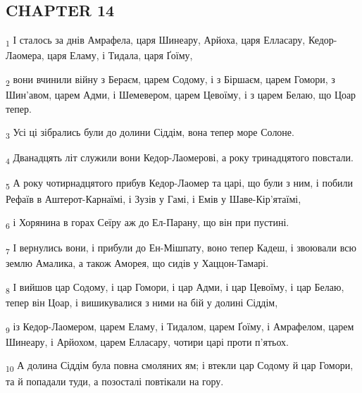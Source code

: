 \subsection{CHAPTER 14}
\begin{tcolorbox}
\textsubscript{1} І сталось за днів Амрафела, царя Шинеару, Арйоха, царя Елласару, Кедор-Лаомера, царя Еламу, і Тидала, царя Ґоїму,
\end{tcolorbox}
\begin{tcolorbox}
\textsubscript{2} вони вчинили війну з Бераєм, царем Содому, і з Біршаєм, царем Гомори, з Шин'авом, царем Адми, і Шемевером, царем Цевоїму, і з царем Белаю, що Цоар тепер.
\end{tcolorbox}
\begin{tcolorbox}
\textsubscript{3} Усі ці зібрались були до долини Сіддім, вона тепер море Солоне.
\end{tcolorbox}
\begin{tcolorbox}
\textsubscript{4} Дванадцять літ служили вони Кедор-Лаомерові, а року тринадцятого повстали.
\end{tcolorbox}
\begin{tcolorbox}
\textsubscript{5} А року чотирнадцятого прибув Кедор-Лаомер та царі, що були з ним, і побили Рефаїв в Аштерот-Карнаїмі, і Зузів у Гамі, і Емів у Шаве-Кір'ятаїмі,
\end{tcolorbox}
\begin{tcolorbox}
\textsubscript{6} і Хорянина в горах Сеїру аж до Ел-Парану, що він при пустині.
\end{tcolorbox}
\begin{tcolorbox}
\textsubscript{7} І вернулись вони, і прибули до Ен-Мішпату, воно тепер Кадеш, і звоювали всю землю Амалика, а також Аморея, що сидів у Хаццон-Тамарі.
\end{tcolorbox}
\begin{tcolorbox}
\textsubscript{8} І вийшов цар Содому, і цар Гомори, і цар Адми, і цар Цевоїму, і цар Белаю, тепер він Цоар, і вишикувалися з ними на бій у долині Сіддім,
\end{tcolorbox}
\begin{tcolorbox}
\textsubscript{9} із Кедор-Лаомером, царем Еламу, і Тидалом, царем Ґоїму, і Амрафелом, царем Шинеару, і Арйохом, царем Елласару, чотири царі проти п'ятьох.
\end{tcolorbox}
\begin{tcolorbox}
\textsubscript{10} А долина Сіддім була повна смоляних ям; і втекли цар Содому й цар Гомори, та й попадали туди, а позосталі повтікали на гору.
\end{tcolorbox}

